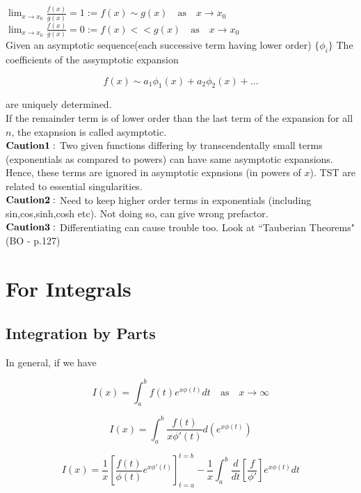 \documentclass{report}
\begin{document}
$\lim_{x\to x_0} \frac{f(x)}{g(x)} = 1 := f(x) \sim g(x) \quad\mathrm{as}\quad  x\to x_0$\\

\noindent$\lim_{x\to x_0} \frac{f(x)}{g(x)} = 0 := f(x) << g(x)\quad\mathrm{as}\quad  x\to x_0$\\


\noindent Given an asymptotic sequence(each successive term having lower order) $\{\phi_i\}$ The coefficients of the assymptotic expansion 

$$ f(x) \sim a_1\phi_1(x) + a_2\phi_2(x) + ... $$

\noindent are uniquely determined.\\

\noindent If the remainder term is of lower order than the last term of the expansion for all $n$, the exapnsion is called asymptotic.\\

\noindent $\bold{Caution 1:}$ Two given functions differing by transcendentally small terms (exponentials as compared to powers) can have same asymptotic expansions. Hence, these terms are ignored in asymptotic expnsions (in powers of $x$). TST are related to essential singularities.\\

\noindent $\bold {Caution 2:}$ Need to keep higher order terms in exponentials (including sin,cos,sinh,cosh etc). Not doing so, can give wrong prefactor.\\

\noindent $\bold{Caution 3:}$ Differentiating can cause trouble too. Look at ``Tauberian Theorems" (BO - p.127)

\section{For Integrals}

\subsection{Integration by Parts}

\noindent In general, if we have

$$I(x) = \int_{a}^{b} f(t) e^{x\phi(t)} dt \quad\mathrm{as}\quad x\to\infty$$ 

$$I(x) = \int_{a}^{b} \frac{f(t)}{x\phi'(t)} d(e^{x\phi(t)})$$

$$I(x) = \frac{1}{x} \left[\frac{f(t)}{\phi(t)} e^{x\phi'(t)}\right]_{t=a}^{t=b} - \frac{1}{x}\int_{a}^{b}\frac {d}{dt}\left[\frac{f}{\phi'}\right]e^{x\phi(t)}dt $$
\end{document}
